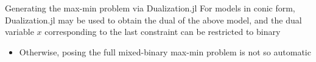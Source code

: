 \documentclass[xcolor=dvipsnames]{beamer}
\newcommand{\llll}{l}
\begin{document}
%

\begin{frame}{Generating the max-min problem via Dualization.jl}
For models in conic form, Dualization.jl may be used to obtain the dual of the above model, and the dual variable $x$ corresponding to the last constraint can be restricted to binary
\begin{itemize}
\item Otherwise, posing the full mixed-binary max-min problem is not so automatic
\end{itemize}
\end{frame}
\end{document}
